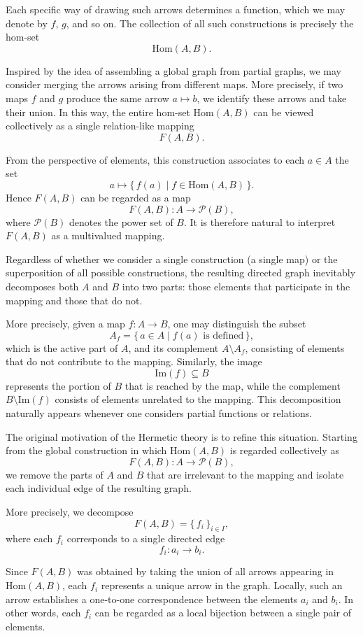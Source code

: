\documentclass[11pt]{book}
\theoremstyle{definition}
\theoremstyle{plain}
\theoremstyle{remark}
\begin{document}
Each specific way of drawing such arrows determines a function, which we may denote by $f$, $g$, and so on. 
The collection of all such constructions is precisely the hom-set
\[
\mathrm{Hom}(A,B).
\]

Inspired by the idea of assembling a global graph from partial graphs, we may consider merging the 
arrows arising from different maps. More precisely, if two maps $f$ and $g$ produce the same arrow $a \mapsto b$, 
we identify these arrows and take their union. In this way, the entire hom-set $\mathrm{Hom}(A,B)$ can be viewed 
collectively as a single relation-like mapping
\[
F(A,B).
\]

From the perspective of elements, this construction associates to each $a \in A$ the set
\[
a \longmapsto \{\, f(a) \mid f \in \mathrm{Hom}(A,B) \,\}.
\]
Hence $F(A,B)$ can be regarded as a map
\[
F(A,B) : A \longrightarrow \mathcal{P}(B),
\]
where $\mathcal{P}(B)$ denotes the power set of $B$. 
It is therefore natural to interpret $F(A,B)$ as a multivalued mapping.

Regardless of whether we consider a single construction (a single map) or the superposition of all possible constructions, 
the resulting directed graph inevitably decomposes both $A$ and $B$ into two parts: those elements that participate in 
the mapping and those that do not.

More precisely, given a map $f:A\to B$, one may distinguish the subset
\[
A_f = \{\, a \in A \mid f(a) \text{ is defined} \,\},
\]
which is the active part of $A$, and its complement $A\setminus A_f$, consisting of elements that do not contribute to the mapping. 
Similarly, the image
\[
\mathrm{Im}(f) \subseteq B
\]
represents the portion of $B$ that is reached by the map, while the complement $B\setminus \mathrm{Im}(f)$ 
consists of elements unrelated to the mapping. This decomposition naturally appears whenever one considers 
partial functions or relations.

The original motivation of the Hermetic theory is to refine this situation. 
Starting from the global construction in which $\mathrm{Hom}(A,B)$ is regarded collectively as
\[
F(A,B): A \longrightarrow \mathcal{P}(B),
\]
we remove the parts of $A$ and $B$ that are irrelevant to the mapping and isolate each individual edge of the resulting graph.

More precisely, we decompose
\[
F(A,B)=\{\, f_i \,\}_{i\in I},
\]
where each $f_i$ corresponds to a single directed edge
\[
f_i : a_i \longrightarrow b_i .
\]

Since $F(A,B)$ was obtained by taking the union of all arrows appearing in $\mathrm{Hom}(A,B)$, each $f_i$ 
represents a unique arrow in the graph. Locally, such an arrow establishes a one-to-one correspondence between 
the elements $a_i$ and $b_i$. In other words, each $f_i$ can be regarded as a local bijection between a single pair of elements.
\end{document}
